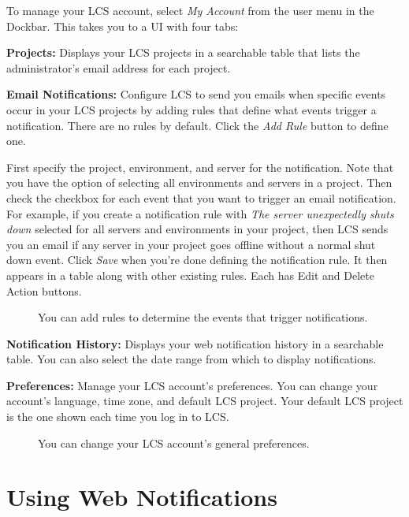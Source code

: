 To manage your LCS account, select \emph{My Account} from the user menu
in the Dockbar. This takes you to a UI with four tabs:

\textbf{Projects:} Displays your LCS projects in a searchable table that
lists the administrator's email address for each project.

\textbf{Email Notifications:} Configure LCS to send you emails when
specific events occur in your LCS projects by adding rules that define
what events trigger a notification. There are no rules by default. Click
the \emph{Add Rule} button to define one.

First specify the project, environment, and server for the notification.
Note that you have the option of selecting all environments and servers
in a project. Then check the checkbox for each event that you want to
trigger an email notification. For example, if you create a notification
rule with \emph{The server unexpectedly shuts down} selected for all
servers and environments in your project, then LCS sends you an email if
any server in your project goes offline without a normal shut down
event. Click \emph{Save} when you're done defining the notification
rule. It then appears in a table along with other existing rules. Each
has Edit and Delete Action buttons.

\begin{figure}
\centering
{}
\caption{You can add rules to determine the events that trigger
notifications.}
\end{figure}

\textbf{Notification History:} Displays your web notification history in
a searchable table. You can also select the date range from which to
display notifications.

\textbf{Preferences:} Manage your LCS account's preferences. You can
change your account's language, time zone, and default LCS project. Your
default LCS project is the one shown each time you log in to LCS.

\begin{figure}
\centering
{}
\caption{You can change your LCS account's general preferences.}
\end{figure}

\section{Using Web Notifications}\label{using-web-notifications}


